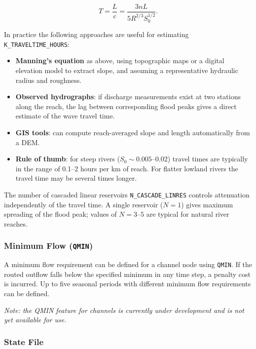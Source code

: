 \documentclass[a4paper, 12pt]{report}
\begin{document}
	\begin{equation}
		T = \frac{L}{c} = \frac{3nL}{5 R^{2/3} S_0^{1/2}}.
	\end{equation}
	
	\noindent In practice the following approaches are useful for estimating
	\texttt{K\_TRAVELTIME\_HOURS}:
	
	\begin{itemize}
		\item \textbf{Manning's equation} as above, using topographic maps or a digital
		elevation model to extract slope, and assuming a representative hydraulic
		radius and roughness.
		
		\item \textbf{Observed hydrographs}: if discharge measurements exist at two
		stations along the reach, the lag between corresponding flood peaks gives a
		direct estimate of the wave travel time.
		
		\item \textbf{GIS tools}: can compute reach-averaged slope and length automatically from a DEM.
		
		\item \textbf{Rule of thumb}: for steep rivers ($S_0 \sim 0.005$--$0.02$)
		travel times are typically in the range of 0.1--2 hours per km of reach.
		For flatter lowland rivers the travel time may be several times longer.
	\end{itemize}
	
	The number of cascaded linear reservoirs \texttt{N\_CASCADE\_LINRES} controls
	attenuation independently of the travel time. A single reservoir ($N=1$) gives
	maximum spreading of the flood peak; values of $N = 3$--$5$ are typical for
	natural river reaches.
	
	\subsubsection{Minimum Flow (\texttt{QMIN})}

	A minimum flow requirement can be defined for a channel node using \texttt{QMIN}. If the
	routed outflow falls below the specified minimum in any time step, a penalty cost is incurred.
	Up to five seasonal periods with different minimum flow requirements can be defined.

	\textit{Note: the QMIN feature for channels is currently under development and is not yet available for use.}

	\subsubsection{State File}
\end{document}
